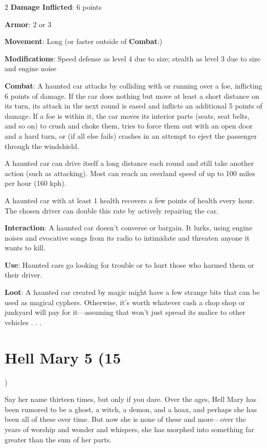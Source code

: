 \begin{multicols}{2}
\textbf{Damage Inflicted}: 6 points 

\textbf{Armor}: 2 or 3 

\textbf{Movement}: Long (or faster outside of \textbf{Combat}:) 

\textbf{Modifications}: Speed defense as level 4 due to size; stealth as level 3 due to size and engine noise 

\textbf{Combat}: A haunted car attacks by colliding with or running over a foe, inflicting 6 points of damage. If the car does nothing but move at least a short distance on its turn, its attack in the next round is eased and inflicts an additional 5 points of damage. If a foe is within it, the car moves its interior parts (seats, seat belts, and so on) to crush and choke them, tries to force them out with an open door and a hard turn, or (if all else fails) crashes in an attempt to eject the passenger through the windshield. 

A haunted car can drive itself a long distance each round and still take another action (such as attacking). Most can reach an overland speed of up to 100 miles per hour (160 kph). 

A haunted car with at least 1 health recovers a few points of health every hour. The chosen driver can double this rate by actively repairing the car. 

\textbf{Interaction}: A haunted car doesn’t converse or bargain. It lurks, using engine noises and evocative songs from its radio to intimidate and threaten anyone it wants to kill. 

\textbf{Use}: Haunted cars go looking for trouble or to hurt those who harmed them or their driver. 

\textbf{Loot}: A haunted car created by magic might have a few strange bits that can be used as magical cyphers. Otherwise, it’s worth whatever cash a chop shop or junkyard will pay for it—assuming that won’t just spread its malice to other vehicles . . .

\section{Hell Mary 5 (15})

Say her name thirteen times, but only if you dare. Over the ages, Hell Mary has been rumored to be a ghost, a witch, a demon, and a hoax, and perhaps she has been all of these over time. But now she is none of these and more—over the years of worship and wonder and whispers, she has morphed into something far greater than the sum of her parts. 


\end{multicols}
